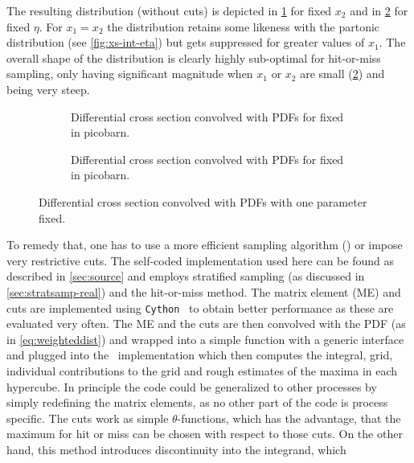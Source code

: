 The resulting distribution (without cuts) is depicted in
\cref{fig:dist-pdf} for fixed \(x_2\) and in
\cref{fig:dist-pdf-fixed-eta} for fixed \(\eta\). For \(x_1 = x_2\)
the distribution retains some likeness with the partonic distribution
(see \cref{fig:xs-int-eta}) but gets suppressed for greater values of
\(x_1\). The overall shape of the distribution is clearly highly
sub-optimal for hit-or-miss sampling, only having significant magnitude
when \(x_1\) or \(x_2\) are small (\cref{fig:dist-pdf-fixed-eta}) and
being very steep.
%
\begin{figure}[ht]
  \centering
  \begin{subfigure}{1\textwidth}
    \centering {}
    \caption{\label{fig:dist-pdf}Differential cross section convolved
      with PDFs for fixed \protect {} in
      picobarn.}
  \end{subfigure}
%
  \begin{subfigure}{1\textwidth}
    \centering {}
    \caption{\label{fig:dist-pdf-fixed-eta}Differential cross section
      convolved with PDFs for fixed \protect
       in picobarn.}
  \end{subfigure}
  \caption{\label{fig:dist-pdf-3d}Differential cross section
    convolved with PDFs with one parameter fixed.}
\end{figure}
%
To remedy that, one has to use a more efficient sampling algorithm
(\vegas) or impose very restrictive cuts. The self-coded
implementation used here can be found as described in
\cref{sec:source} and employs stratified sampling (as discussed in
\cref{sec:stratsamp-real}) and the hit-or-miss method. The matrix
element (ME) and cuts are implemented using
\texttt{Cython}~\cite{behnel2011:cy} to obtain better performance as
these are evaluated very often. The ME and the cuts are then convolved
with the PDF (as in \cref{eq:weighteddist}) and wrapped into a simple
function with a generic interface and plugged into the \vegas\
implementation which then computes the integral, grid, individual
contributions to the grid and rough estimates of the maxima in each
hypercube. In principle the code could be generalized to other
processes by simply redefining the matrix elements, as no other part
of the code is process specific. The cuts work as simple
\(\theta\)-functions, which has the advantage, that the maximum for
hit or miss can be chosen with respect to those cuts. On the other
hand, this method introduces discontinuity into the integrand, which

